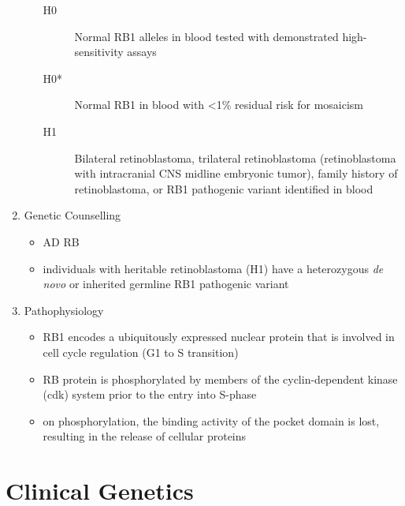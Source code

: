 \documentclass[12pt]{scrartcl}
\begin{document}
\begin{enumerate}
\begin{itemize}
\begin{description}
\item[{H0}] Normal RB1 alleles in blood tested with demonstrated
high-sensitivity assays

\item[{H0*}] Normal RB1 in blood with <1\% residual risk for mosaicism

\item[{H1}] Bilateral retinoblastoma, trilateral retinoblastoma
(retinoblastoma with intracranial CNS midline embryonic
tumor), family history of retinoblastoma, or RB1 pathogenic
variant identified in blood
\end{description}
\end{itemize}

\item Genetic Counselling
\label{sec:org6ed3879}
\begin{itemize}
\item AD RB
\item individuals with heritable retinoblastoma (H1) have a heterozygous
\emph{de novo} or inherited germline RB1 pathogenic variant
\end{itemize}

\item Pathophysiology
\label{sec:orgdb863de}
\begin{itemize}
\item RB1 encodes a ubiquitously expressed nuclear protein that is
involved in cell cycle regulation (G1 to S transition)
\item RB protein is phosphorylated by members of the cyclin-dependent kinase
(cdk) system prior to the entry into S-phase
\item on phosphorylation, the binding activity of the pocket domain is
lost, resulting in the release of cellular proteins
\end{itemize}
\end{enumerate}

\section{Clinical Genetics}
\label{sec:org1d5ef7f}
\end{document}
